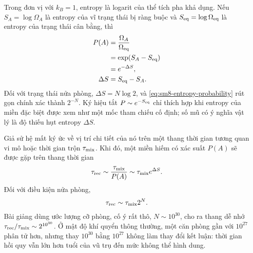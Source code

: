 Trong đơn vị với \(k_B=1\), entropy là logarit của thể tích pha khả dụng. Nếu \(S_A=\log\Omega_A\) là entropy của vĩ trạng thái bị ràng buộc và \(S_{\rm eq}=\log\Omega_{\rm eq}\) là entropy của trạng thái cân bằng, thì
\begin{equation}
 \begin{aligned}
 P(A)
 &=\frac{\Omega_A}{\Omega_{\rm eq}}\\
 &=\exp\!\left(S_A-S_{\rm eq}\right)\\
 &=e^{-\Delta S},\\
 \Delta S&=S_{\rm eq}-S_A.
 \end{aligned}
 \label{eq:sm8-entropy-probability}
\end{equation}
Đối với trạng thái nửa phòng, \(\Delta S=N\log 2\), và
\eqref{eq:sm8-entropy-probability} rút gọn chính xác thành \(2^{-N}\).
Ký hiệu tắt \(P\sim e^{-S_{\rm eq}}\) chỉ thích hợp khi entropy của miền đặc biệt được xem như một mốc tham chiếu cố định; số mũ có ý nghĩa vật lý là độ thiếu hụt entropy \(\Delta S\).

\begin{classroomqa}
\end{classroomqa}

Giả sử hệ mất ký ức về vị trí chi tiết của nó trên một thang thời gian tương quan vi mô hoặc thời gian trộn \(\tau_{\rm mix}\). Khi đó, một miền hiếm có xác suất \(P(A)\) sẽ được gặp trên thang thời gian
\begin{equation}
 \tau_{\rm rec}
 \sim \frac{\tau_{\rm mix}}{P(A)}
 \sim \tau_{\rm mix}e^{\Delta S}.
 \label{eq:sm8-recurrence-time-general}
\end{equation}
Đối với điều kiện nửa phòng,
\begin{equation}
 \tau_{\rm rec}\sim\tau_{\rm mix}2^N.
 \label{eq:sm8-recurrence-time-half}
\end{equation}
Bài giảng dùng ước lượng cỡ phòng, cố ý rất thô, \(N\sim10^{30}\), cho ra thang dễ nhớ
\(\tau_{\rm rec}/\tau_{\rm mix}\sim2^{10^{30}}\). Ở mật độ khí quyển thông thường, một căn phòng gần với \(10^{27}\) phân tử hơn, nhưng thay \(10^{30}\) bằng \(10^{27}\) không làm thay đổi kết luận: thời gian hồi quy vẫn lớn hơn tuổi của vũ trụ đến mức không thể hình dung.

